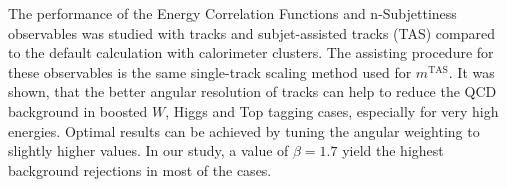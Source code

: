 \documentclass[UKenglish,texlive=2013]{\ATLASLATEXPATH atlasdoc}
\newcommand{\mta}{\ensuremath{m^\textrm{TA}}\xspace}
\newcommand{\mtas}{\ensuremath{m^\textrm{TAS}}\xspace}
\newcommand{\mcal}{\ensuremath{m^\textrm{calo}}\xspace}
\newcommand{\mcomb}{\ensuremath{m^\textrm{comb}}\xspace}
\newcommand{\mcombtas}{\ensuremath{m^\textrm{comb,\,TAS}}\xspace}
\begin{document}






The performance of the Energy Correlation Functions and n-Subjettiness observables was studied with tracks and subjet-assisted tracks (TAS) compared to the default calculation with calorimeter clusters. The assisting procedure for these observables is the same single-track scaling method used for $\mtas$. It was shown, that the better angular resolution of tracks can help to reduce the QCD background in boosted $W$, Higgs and Top tagging cases, especially for very high energies. Optimal results can be achieved by tuning the angular weighting to slightly higher values. In our study, a value of $\beta=1.7$ yield the highest background rejections in most of the cases. 
\end{document}
